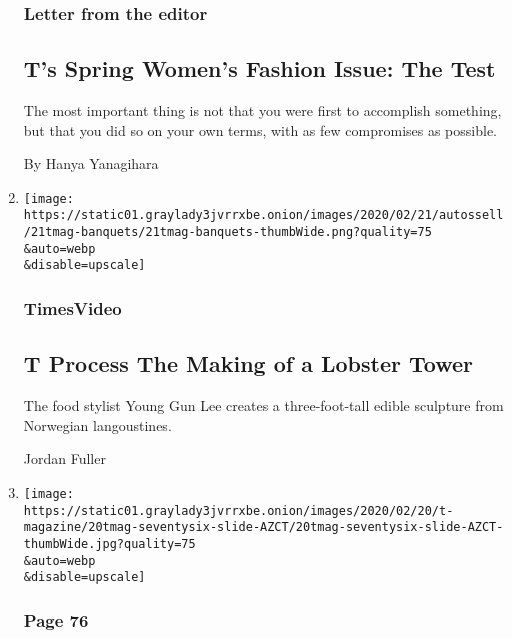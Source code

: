 \begin{enumerate}
  \hypertarget{letter-from-the-editor}{%
  \subsubsection{Letter from the editor}\label{letter-from-the-editor}}

  \hypertarget{ts-spring-womens-fashion-issue-the-test}{%
  \subsection{T's Spring Women's Fashion Issue: The
  Test}\label{ts-spring-womens-fashion-issue-the-test}}

  The most important thing is not that you were first to accomplish
  something, but that you did so on your own terms, with as few
  compromises as possible.

  By Hanya Yanagihara
\item
  \href{/video/t-magazine/100000006981030/t-process-the-making-of-a-lobster-tower.html}{}

  \texttt{[image: https://static01.graylady3jvrrxbe.onion/images/2020/02/21/autossell/21tmag-banquets/21tmag-banquets-thumbWide.png?quality=75\\\&auto=webp\\\&disable=upscale]}

  \hypertarget{timesvideo-2}{%
  \subsubsection{TimesVideo}\label{timesvideo-2}}

  \hypertarget{t-process--the-making-of-a-lobster-tower}{%
  \subsection{T Process \textbar{} The Making of a Lobster
  Tower}\label{t-process--the-making-of-a-lobster-tower}}

  The food stylist Young Gun Lee creates a three-foot-tall edible
  sculpture from Norwegian langoustines.

  Jordan Fuller
\item
  \href{/2020/02/20/t-magazine/spring-books.html}{}

  \texttt{[image: https://static01.graylady3jvrrxbe.onion/images/2020/02/20/t-magazine/20tmag-seventysix-slide-AZCT/20tmag-seventysix-slide-AZCT-thumbWide.jpg?quality=75\\\&auto=webp\\\&disable=upscale]}

  \hypertarget{page-76}{%
  \subsubsection{Page 76}\label{page-76}}


\end{enumerate}
